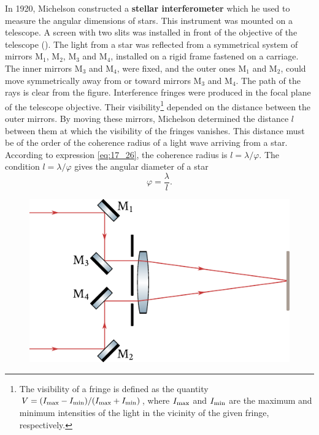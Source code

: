 In 1920, Michelson constructed a \textbf{stellar interferometer} which he used to measure the angular dimensions of stars.
This instrument was mounted on a telescope.
A screen with two slits was installed in front of the objective of the telescope ().
The light from a star was reflected from a symmetrical system of mirrors M$_1$, M$_2$, M$_3$ and M$_4$, installed on a rigid frame fastened on a carriage.
The inner mirrors M$_3$ and M$_4$, were fixed, and the outer ones M$_1$ and M$_2$, could move symmetrically away from or toward mirrors M$_3$ and M$_4$.
The path of the rays is clear from the figure.
Interference fringes were produced in the focal plane of the telescope objective.
Their visibility\footnote{The visibility of a fringe is defined as the quantity $V = (I_{\text{max}}-I_{\text{min}})/(I_{\text{max}}+I_{\text{min}})$, where $I_{\text{max}}$ and $I_{\text{min}}$ are the maximum and minimum intensities of the light in the vicinity of the given fringe, respectively.} depended on the distance between the outer mirrors.
By moving these mirrors, Michelson determined the distance $l$ between them at which the visibility of the fringes vanishes.
This distance must be of the order of the coherence radius of a light wave arriving from a star.
According to expression \eqref{eq:17_26}, the coherence radius is $l=\lambda/\varphi$.
The condition $l=\lambda/\varphi$ gives the angular diameter of a star
\begin{equation*}
    \varphi = \frac{\lambda}{l}.
\end{equation*}

\begin{figure}[t]
	\begin{center}
		\includegraphics[scale=0.9]{figures/ch_17/fig_17_17.pdf}
		\caption[]{}
		\label{fig:17_17}
	\end{center}
	\vspace{-0.8cm}
\end{figure}

